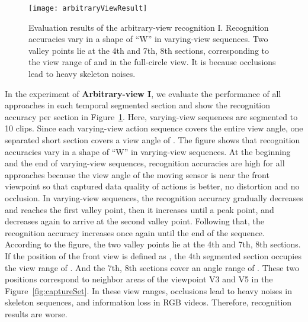 \documentclass[journal]{IEEEtran}
\begin{document}
\begin{figure}[t]
\begin{center}
\texttt{[image: arbitraryViewResult]}
\end{center}
   \caption{Evaluation results of the arbitrary-view recognition I. Recognition accuracies vary in a shape of ``W'' in varying-view sequences. Two valley points lie at the 4th and 7th, 8th sections, corresponding to the view range of  and  in the full-circle view. It is because occlusions lead to heavy skeleton noises.}
\label{fig:arbitrary}
\end{figure}

In the experiment of \textbf{Arbitrary-view I}, we evaluate the performance of all approaches in each temporal segmented section and show the recognition accuracy per section in Figure~\ref{fig:arbitrary}. Here, varying-view sequences are segmented to 10 clips. Since each varying-view action sequence covers the entire  view angle, one separated short section covers a view angle of .
The figure shows that recognition accuracies vary in a shape of ``W'' in varying-view sequences. At the beginning and the end of varying-view sequences, recognition accuracies are high for all approaches because the view angle of the moving sensor is near the front viewpoint so that captured data quality of actions is better, no distortion and no occlusion. In varying-view sequences, the recognition accuracy gradually decreases and reaches the first valley point, then it increases until a peak point, and decreases again to arrive at the second valley point. Following that, the recognition accuracy increases once again until the end of the sequence. According to the figure, the two valley points lie at the 4th and 7th, 8th sections. If the position of the front view is defined as , the 4th segmented section occupies the view range of . And the 7th, 8th sections cover an angle range of . These two positions correspond to neighbor areas of the viewpoint V3 and V5 in the Figure~\ref{fig:captureSet}. In these view ranges, occlusions lead to heavy noises in skeleton sequences, and information loss in RGB videos. Therefore, recognition results are worse.
\end{document}
